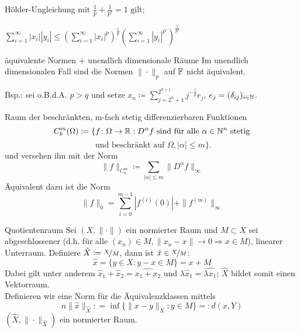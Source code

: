 	\begin{karte}{Hölder-Ungleichung}
		 mit $\frac{1}{p} + \frac{1}{p'} = 1 \text{ gilt; }$
		 
		 $\sum_{i=1}^{\infty} |x_{i}| |y_{i}| \leq \left( \sum_{i=1}^{\infty} |x_{i}|^{p} \right)^{\frac{1}{p}} \left( \sum_{i=1}^{\infty} |y_{i}|^{p'} \right)^{\frac{1}{p'}} $	
	\end{karte}
	
	\begin{karte}{äquivalente Normen + unendlich dimensionale Räume}
		Im unendlich dimensionalen Fall sind die Normen $\| \cdot \|_{p}$ auf $\mathbb{F}$ nicht äquivalent.
		
		Bsp.: sei o.B.d.A. $p > q$ und setze $x_{n} \coloneqq \sum_{j = 2^{n} + 1}^{2^{n + 1}} j^{-\frac{1}{p}}e_{j}$, $e_{j} = ( \delta_{ij} )_{i \in \mathbb{N}}$. \\
	\end{karte}
	
	\begin{karte}{Raum der beschränkten, m-fach stetig differenzierbaren Funktionen}	
		\[ C_{b}^{m}(\Omega) \coloneqq \{ f \colon \Omega \rightarrow \mathbb{R} : D^{\alpha}f \text{ sind für alle } \alpha \in \mathbb{N}^{n} \text{ stetig} \] \[ \text{ und beschränkt auf } \Omega, |\alpha| \leq m \}. \]	
		und versehen ihn mit der Norm 
			\[ \| f \|_{C_{b}^{m}} \coloneqq \sum_{|\alpha| \leq m} \| D^{\alpha}f \|_{\infty} \]
		Äquivalent dazu ist die Norm
		\[ \| f \|_{0} = \sum_{i = 0}^{m - 1} |f^{(i)}(0)| + \| f^{(m)} \|_{\infty} \]
	\end{karte}
	
	\begin{karte}{Quotientenraum}		
	Sei $(X, \| \cdot \|)$ ein normierter Raum und $M \subset X$ sei abgeschlossener (d.h. für alle $(x_{n}) \in M, \| x_{n} - x \| \rightarrow 0 \Rightarrow x \in M$), linearer Unterraum.
	Definiere $\hat X \coloneqq \nicefrac{X}{M}$, dann ist $\hat x \in \nicefrac{X}{M}$:
		\[ \hat x = \{ y \in X: y - x \in M \} = x + M \]
	Dabei gilt unter anderem $\hat x_{1} + \hat x_{2} = \widehat{x_{1} + x_{2}}$ und $\lambda \hat x_{1} = \widehat{\lambda x_{1}}$; $\hat X$ bildet somit einen Vektorraum. \\
	Definieren wir eine Norm für die Äquivalenzklassen mittels
		\[n\| \hat x \|_{\hat X} : = \inf \{ \| x - y \|_{X}: y \in M \} =: d(x, Y) \]
	$(\hat X, \| \cdot \|_{\hat X})$ ein normierter Raum.
	\end{karte}